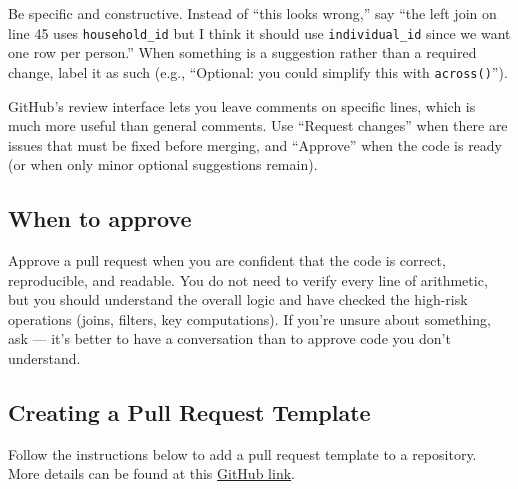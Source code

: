 \documentclass[
]{book}
\begin{document}
Be specific and constructive. Instead of ``this looks wrong,'' say ``the left join on line 45 uses \texttt{household\_id} but I think it should use \texttt{individual\_id} since we want one row per person.'' When something is a suggestion rather than a required change, label it as such (e.g., ``Optional: you could simplify this with \texttt{across()}'').

GitHub's review interface lets you leave comments on specific lines, which is much more useful than general comments. Use ``Request changes'' when there are issues that must be fixed before merging, and ``Approve'' when the code is ready (or when only minor optional suggestions remain).

\subsection{When to approve}\label{when-to-approve}

Approve a pull request when you are confident that the code is correct, reproducible, and readable. You do not need to verify every line of arithmetic, but you should understand the overall logic and have checked the high-risk operations (joins, filters, key computations). If you're unsure about something, ask --- it's better to have a conversation than to approve code you don't understand.

\subsection{Creating a Pull Request Template}\label{creating-a-pull-request-template}

Follow the instructions below to add a pull request template to a repository. More details can be found at this \href{https://help.github.com/en/github/building-a-strong-community/creating-a-pull-request-template-for-your-repository}{GitHub link}.
\end{document}
